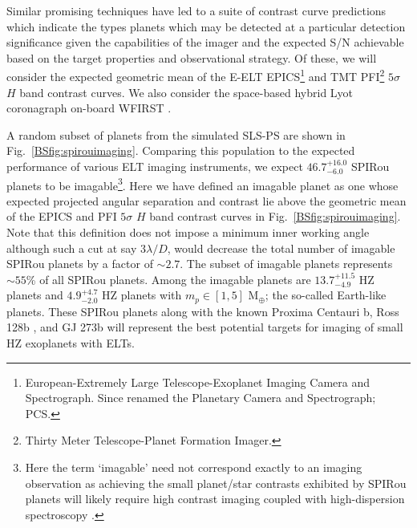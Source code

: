 Similar promising
techniques have led to a suite of contrast curve predictions which indicate the types planets
which may be detected at a particular detection significance given the capabilities of the
imager and the expected S/N achievable based on the target properties and observational strategy. Of these,
we will consider the expected geometric mean of the E-ELT
EPICS\footnote{European-Extremely Large Telescope-Exoplanet Imaging Camera and Spectrograph. Since renamed the
Planetary Camera and Spectrograph; PCS.}
\citep{kasper10} and TMT PFI\footnote{Thirty Meter Telescope-Planet Formation Imager.} \citep{macintosh06}
$5\sigma$ $H$ band contrast curves.
We also consider the space-based hybrid Lyot coronagraph on-board WFIRST \citep{trauger15}.

A random subset of planets from the simulated SLS-PS are shown in Fig.~\ref{BSfig:spirouimaging}.
Comparing this population to the expected performance 
of various ELT imaging instruments, we expect $46.7^{+16.0}_{-6.0}$ SPIRou planets to be
imagable\footnote{Here the term `imagable' need not correspond exactly to an imaging observation as achieving
    the small planet/star contrasts exhibited by SPIRou planets will likely require high contrast imaging
    coupled with high-dispersion spectroscopy \citep[e.g.][]{snellen15}.}.
Here we have defined an imagable planet as one whose expected projected angular separation and contrast
lie above the geometric mean of the EPICS and PFI $5\sigma$ $H$ band contrast curves in
Fig.~\ref{BSfig:spirouimaging}. Note that this definition does not impose a minimum inner working
  angle although such a cut at say $3 \lambda /D$, would decrease the total number of imagable SPIRou planets by
  a factor of $\sim 2.7$.
The subset of imagable planets represents $\sim 55$\% of all SPIRou planets. Among the imagable planets
are $13.7^{+11.5}_{-4.9}$ HZ planets and $4.9^{+4.7}_{-2.0}$ HZ planets with $m_p \in [1,5]$ M$_{\oplus}$; the so-called
Earth-like planets. These SPIRou planets along 
with the known Proxima Centauri b, Ross 128b \citep{bonfils17a}, and GJ 273b \citep{astudillodefru17} 
will represent the best potential targets for imaging of small HZ exoplanets with ELTs.

